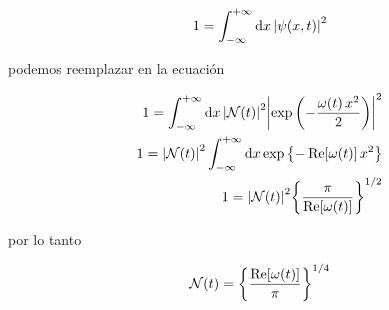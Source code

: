 \documentclass[../Main.tex]{subfiles}
\begin{document}
\begin{equation}
1=\int_{-\infty}^{+\infty}\dd{x}\abs{\psi (x,t)}^2
\end{equation}

podemos reemplazar en la ecuación

\begin{align*}
1=\int_{-\infty}^{+\infty}\dd{x}\abs{\mathcal{N}(t)}^2\abs{\exp \pqty{- \frac{ \omega(t) \, x^2}{2} }}^2 \\
1=\abs{\mathcal{N}(t)}^2\int_{-\infty}^{+\infty}\dd{x}\exp \Bqty{- \Re[\omega(t)] \, x^2 } \\
1=\abs{\mathcal{N}(t)}^2\Bqty{\dfrac{\pi}{\Re[\omega (t)]}}^{1/2}
\end{align*}

por lo tanto

\begin{equation}
\mathcal{N}(t)=\Bqty{\dfrac{\Re[\omega (t)]}{\pi}}^{1/4}
\end{equation}




%
\end{document}
